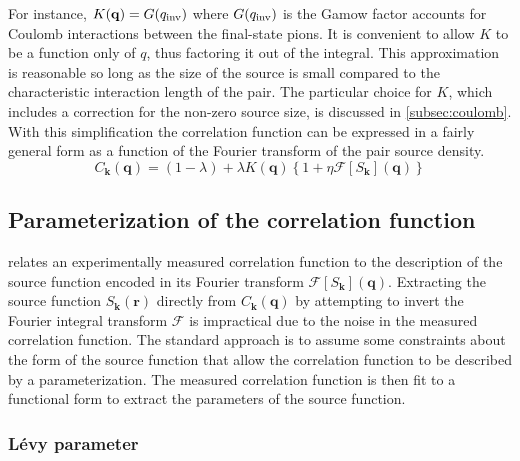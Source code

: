 For instance, $K(\mathbf{q}) = G(q_{\mathrm{inv}})$ where $G(q_{\mathrm{inv}})$ is the Gamow factor accounts for Coulomb interactions between the final-state pions.
It is convenient to allow $K$ to be a function only of $q$, thus factoring it out of the integral.
This approximation is reasonable so long as the size of the source is small compared to the characteristic interaction length of the pair.
The particular choice for $K$, which includes a correction for the non-zero source size, is discussed in \cref{subsec:coulomb}.
With this simplification the correlation function can be expressed in a fairly general form as a function of the Fourier transform of the pair source density.
\begin{equation}
  \label{eq:correlation_function}
  C_\mathbf{k}(\mathbf{q}) = (1-\lambda) + \lambda K(\mathbf{q})\left\{ 1 + \eta \mathcal{F} \left[ S_\mathbf{k} \right](\mathbf{q}) \right\}
\end{equation}


\subsection{Parameterization of the correlation function}
 relates an experimentally measured correlation function to the description of the source function encoded in its Fourier transform $\mathcal{F}[S_\mathbf{k}](\mathbf{q})$.
Extracting the source function $S_\mathbf{k}(\mathbf{r})$ directly from $C_\mathbf{k}(\mathbf{q})$ by attempting to invert the Fourier integral transform $\mathcal{F}$ is impractical due to the noise in the measured correlation function.
The standard approach is to assume some constraints about the form of the source function that allow the correlation function to be described by a parameterization.
The measured correlation function is then fit to a functional form to extract the parameters of the source function.

\subsubsection{L\'evy parameter}

